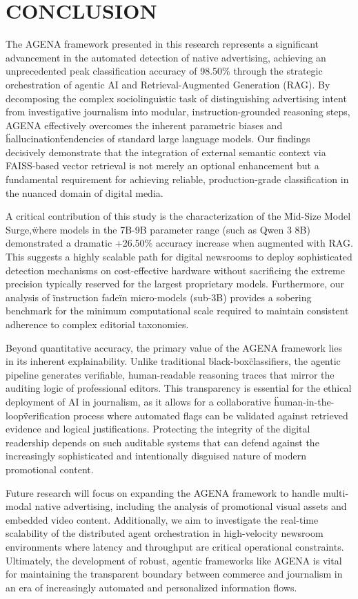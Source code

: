 \documentclass{ieeeaccess}
\begin{document}
\section{CONCLUSION}
The AGENA framework presented in this research represents a significant advancement in the automated detection of native advertising, achieving an unprecedented peak classification accuracy of 98.50\% through the strategic orchestration of agentic AI and Retrieval-Augmented Generation (RAG). By decomposing the complex sociolinguistic task of distinguishing advertising intent from investigative journalism into modular, instruction-grounded reasoning steps, AGENA effectively overcomes the inherent parametric biases and \"hallucination\" tendencies of standard large language models. Our findings decisively demonstrate that the integration of external semantic context via FAISS-based vector retrieval is not merely an optional enhancement but a fundamental requirement for achieving reliable, production-grade classification in the nuanced domain of digital media.

A critical contribution of this study is the characterization of the \"Mid-Size Model Surge,\" where models in the 7B-9B parameter range (such as Qwen 3 8B) demonstrated a dramatic +26.50\% accuracy increase when augmented with RAG. This suggests a highly scalable path for digital newsrooms to deploy sophisticated detection mechanisms on cost-effective hardware without sacrificing the extreme precision typically reserved for the largest proprietary models. Furthermore, our analysis of \"instruction fade\" in micro-models (sub-3B) provides a sobering benchmark for the minimum computational scale required to maintain consistent adherence to complex editorial taxonomies.

Beyond quantitative accuracy, the primary value of the AGENA framework lies in its inherent explainability. Unlike traditional \"black-box\" classifiers, the agentic pipeline generates verifiable, human-readable reasoning traces that mirror the auditing logic of professional editors. This transparency is essential for the ethical deployment of AI in journalism, as it allows for a collaborative \"human-in-the-loop\" verification process where automated flags can be validated against retrieved evidence and logical justifications. Protecting the integrity of the digital readership depends on such auditable systems that can defend against the increasingly sophisticated and intentionally disguised nature of modern promotional content.

Future research will focus on expanding the AGENA framework to handle multi-modal native advertising, including the analysis of promotional visual assets and embedded video content. Additionally, we aim to investigate the real-time scalability of the distributed agent orchestration in high-velocity newsroom environments where latency and throughput are critical operational constraints. Ultimately, the development of robust, agentic frameworks like AGENA is vital for maintaining the transparent boundary between commerce and journalism in an era of increasingly automated and personalized information flows.
\end{document}
